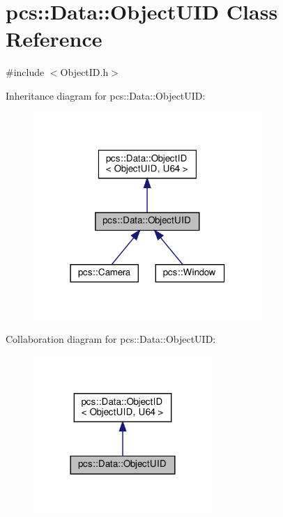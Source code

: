 \hypertarget{classpcs_1_1Data_1_1ObjectUID}{}\section{pcs\+:\+:Data\+:\+:Object\+U\+ID Class Reference}
\label{classpcs_1_1Data_1_1ObjectUID}


{\ttfamily \#include $<$Object\+I\+D.\+h$>$}



Inheritance diagram for pcs\+:\+:Data\+:\+:Object\+U\+ID\+:\nopagebreak
\begin{figure}[H]
\begin{center}
\leavevmode
\includegraphics[width=246pt]{classpcs_1_1Data_1_1ObjectUID__inherit__graph}
\end{center}
\end{figure}


Collaboration diagram for pcs\+:\+:Data\+:\+:Object\+U\+ID\+:\nopagebreak
\begin{figure}[H]
\begin{center}
\leavevmode
\includegraphics[width=192pt]{classpcs_1_1Data_1_1ObjectUID__coll__graph}
\end{center}
\end{figure}
